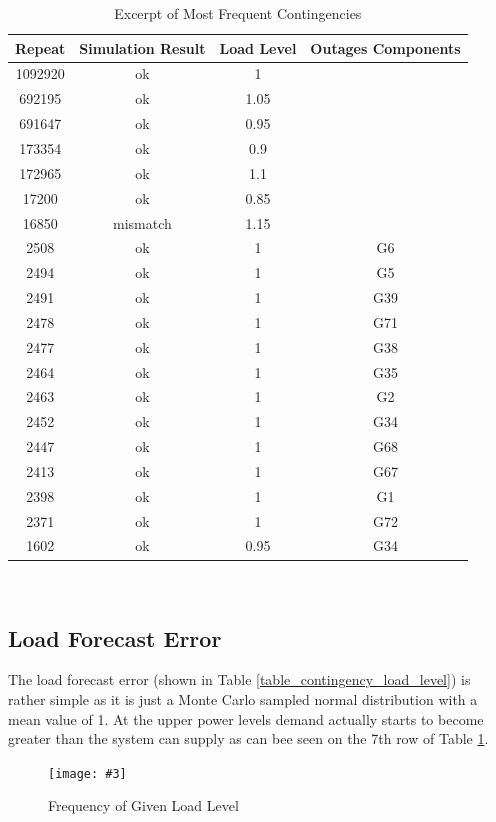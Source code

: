 \documentclass[a4paper,oneside,12pt]{report}
\newcommand{\image}[3] {
  \begin{figure}
    \begin{center}
      \texttt{[image: \#3]}
      \caption{#2}
      \label{#1}
    \end{center}
  \end{figure}
}
\begin{document}
\begin{table}[htbp]
\caption{Excerpt of Most Frequent Contingencies}
\label{table_common_contingencies}
\centering
\begin{tabular}{c||c||c||c}
\bfseries Repeat & \bfseries Simulation Result & \bfseries Load Level & \bfseries Outages Components \\
\hline \hline
1092920 & ok & 1 & \\ 
692195 & ok & 1.05 & \\ 
691647 & ok & 0.95 & \\ 
173354 & ok & 0.9 & \\ 
172965 & ok & 1.1 & \\ 
17200 & ok & 0.85 & \\ 
16850 & mismatch & 1.15 & \\ 
2508 & ok & 1 & G6 \\ 
2494 & ok & 1 & G5 \\ 
2491 & ok & 1 & G39 \\ 
2478 & ok & 1 & G71 \\ 
2477 & ok & 1 & G38 \\ 
2464 & ok & 1 & G35 \\ 
2463 & ok & 1 & G2 \\ 
2452 & ok & 1 & G34 \\ 
2447 & ok & 1 & G68 \\ 
2413 & ok & 1 & G67 \\ 
2398 & ok & 1 & G1 \\ 
2371 & ok & 1 & G72 \\ 
1602 & ok & 0.95 & G34 \\ 
\hline
\end{tabular}\\
\end{table}

\subsection{Load Forecast Error}

The load forecast error (shown in Table \ref{table_contingency_load_level}) is rather simple as it is just a Monte Carlo sampled normal distribution with a mean value of 1. At the upper power levels demand actually starts to become greater than the system can supply as can bee seen on the 7th row of Table \ref{table_common_contingencies}.

\image{loadforecaseerror}{Frequency of Given Load Level}{loadforecaseerror.png}
\end{document}
